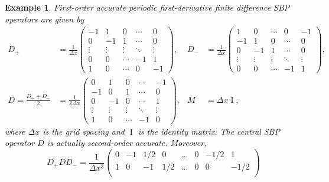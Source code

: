\documentclass{article}
\newtheorem{example}{Example}
\begin{document}
\begin{example}
    First-order accurate periodic first-derivative finite difference
    SBP operators are given by
    \begin{equation}
    \begin{aligned}
        D_+ &= \frac{1}{\Delta x} \begin{pmatrix}
            -1 & 1 & 0 & \cdots & 0 \\
            0 & -1 & 1 & \cdots & 0 \\
            \vdots & \vdots & \vdots & \ddots & \vdots \\
            0 & 0 & \cdots & -1 & 1 \\
            1 & 0 & \cdots & 0 & -1
        \end{pmatrix},
        &
        D_- &= \frac{1}{\Delta x} \begin{pmatrix}
            1 & 0 & \cdots & 0 & -1 \\
            -1 & 1 & 0 & \cdots & 0 \\
            0 & -1 & 1 & \cdots & 0 \\
            \vdots & \vdots & \vdots & \ddots & \vdots \\
            0 & 0 & \cdots & -1 & 1
        \end{pmatrix},
        \\
        D = \frac{D_+ + D_-}{2} &= \frac{1}{2 \Delta x} \begin{pmatrix}
            0 & 1 & 0 & \cdots & -1 \\
            -1 & 0 & 1 & \cdots & 0 \\
            0 & -1 & 0 & \cdots & 1 \\
            \vdots & \vdots & \vdots & \ddots & \vdots \\
            1 & 0 & \cdots & -1 & 0
        \end{pmatrix},
        &
        M &= \Delta x \operatorname{I},
    \end{aligned}
    \end{equation}
    where $\Delta x$ is the grid spacing and $\operatorname{I}$ is the
    identity matrix. The central SBP operator $D$ is actually second-order
    accurate. Moreover,
    \begin{equation}
        D_+ D D_-
        =
        \frac{1}{\Delta x^3} \begin{pmatrix}
            0 & -1 & 1/2 & 0 & \dots & 0 & -1/2 & 1 \\
            1 & 0 & -1 & 1/2 & \dots & 0 & 0 & -1/2 \\

\end{pmatrix}
\end{equation}
\end{example}
\end{document}
